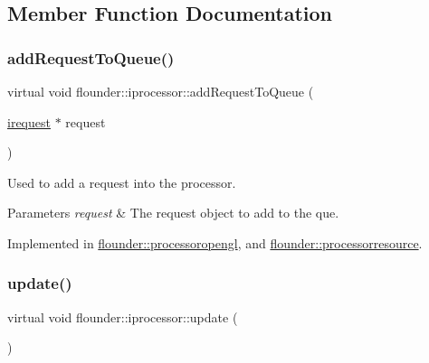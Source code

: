 \subsection{Member Function Documentation}
\mbox{\label{classflounder_1_1iprocessor_ad721814a6a2c69f526527c7b2f57a11b}} 
\subsubsection{\texorpdfstring{add\+Request\+To\+Queue()}{addRequestToQueue()}}
{\footnotesize\ttfamily virtual void flounder\+::iprocessor\+::add\+Request\+To\+Queue (\begin{DoxyParamCaption}\item[{\hyperlink{classflounder_1_1irequest}{irequest} $\ast$}]{request }\end{DoxyParamCaption})\hspace{0.3cm}{\ttfamily [pure virtual]}}



Used to add a request into the processor. 


\begin{DoxyParams}{Parameters}
{\em request} & The request object to add to the que. \\
\hline
\end{DoxyParams}


Implemented in \hyperlink{classflounder_1_1processoropengl_a5063ad5c1f350f26733a748a7e039a9a}{flounder\+::processoropengl}, and \hyperlink{classflounder_1_1processorresource_a4ae0dda615f98e93faadda22e74d61e2}{flounder\+::processorresource}.

\mbox{\label{classflounder_1_1iprocessor_ad2edfece3465ec3dbe0a5feac26bdbc3}} 
\subsubsection{\texorpdfstring{update()}{update()}}
{\footnotesize\ttfamily virtual void flounder\+::iprocessor\+::update (\begin{DoxyParamCaption}{ }\end{DoxyParamCaption})\hspace{0.3cm}{\ttfamily [pure virtual]}}



